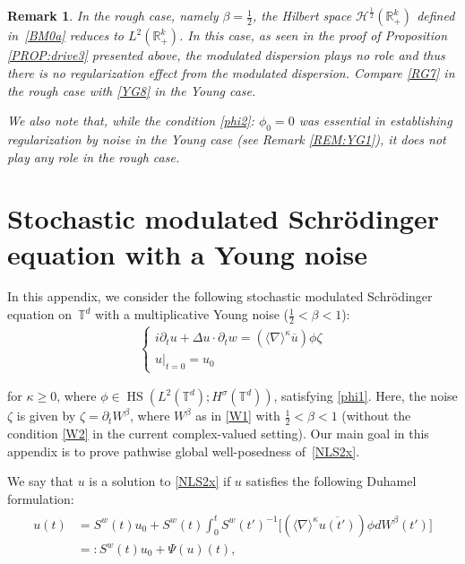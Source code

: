\documentclass[letterpaper, 11pt,  reqno]{amsart}
\newtheorem{remark}[theorem]{Remark}
\DeclareMathOperator{\HS}{HS}
\newcommand{\1}{\hspace{0.5mm}\textup{I}\hspace{0.5mm}}
\newcommand{\noi}{\noindent}
\newcommand{\R}{\mathbb{R}}
\newcommand{\T}{\mathbb{T}}
\renewcommand{\H}{\mathcal{H}}
\newcommand{\be}{\beta}
\newcommand{\nb}{\nabla}
\newcommand{\Dl}{\Delta}
\newcommand{\kk}{\kappa}
\newcommand{\s}{\sigma}
\newcommand{\cj}{\overline}
\newcommand{\dt}{\partial_t}
\newcommand{\jb}[1]
{\langle #1 \rangle}
\newcommand{\sw}{S^w}
\newcommand{\z}{\zeta}
\numberwithin{equation}{section}
\numberwithin{theorem}{section}
\begin{document}
\begin{remark}\label{REM:rough1}\rm
In the rough case, namely $\be= \frac 12$, 
the Hilbert space $\H^\frac 12 (\R_+^k)$
defined in~\eqref{BM0a}
reduces to $L^2(\R_+^k)$.
In this case, as seen in the proof of Proposition \ref{PROP:drive3}
presented above, 
the modulated dispersion plays no role
and thus there is no regularization effect from
the modulated dispersion.
Compare 
\eqref{RG7} in the rough case
with 
\eqref{YG8}
in  the Young case.

We also note that,  
while 
the condition
 \eqref{phi2}: $\phi_0 = 0$
was essential in establishing regularization by noise
in the Young case (see Remark \ref{REM:YG1}), 
it does not play any role in the rough case.



\end{remark}













\appendix 
\section{Stochastic modulated Schr\"odinger equation
with a Young noise}
\label{SEC:NLS}


In this appendix, 
we consider the following stochastic modulated Schr\"odinger equation 
on~$\T^d$ with a multiplicative Young noise ($\frac 12 < \be < 1$):
\begin{align}
\begin{cases}
i \dt u+  \Dl u \cdot \dt w =  (\jb{\nb}^\kk \cj u) \phi \zeta\\
u|_{t = 0} = u_0
\end{cases}
\label{NLS2x}
\end{align}

\noi
for $\kk \ge0$, 
where 
$\phi \in \HS(L^2(\T^d); H^\s(\T^d))$, satisfying
\eqref{phi1}. 
Here, the noise $\z$ is given by $\z = \dt W^\be$, 
where 
 $W^\be$ as in \eqref{W1} with $\frac 12 < \be < 1$
(without the condition \eqref{W2}
in the current complex-valued setting).
Our main goal in this appendix is to prove
pathwise global well-posedness of~\eqref{NLS2x}.




We say that $u$ is a solution to \eqref{NLS2x}
if $u$ satisfies the following
 Duhamel formulation:
\begin{align}
\begin{split}
u(t) 
& = \sw(t) u_0 + 
\sw(t) \int_0^t \sw(t')^{-1}
\big[(\jb{\nb}^\kk \cj{u (t')} )\phi dW^\be(t')\big]\\
& =:
 \sw(t) u_0 + 
\Psi(u)(t), 
\end{split}
\label{ZZ1}
\end{align}
\end{document}
